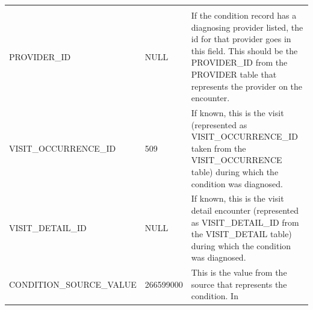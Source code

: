 \documentclass[]{book}
\begin{document}
\begin{longtable}[]{@{}lll@{}}
\begin{minipage}[t]{0.50\columnwidth}
\end{minipage}\tabularnewline
\begin{minipage}[t]{0.27\columnwidth}\raggedright\strut
PROVIDER\_ID\strut
\end{minipage} & \begin{minipage}[t]{0.14\columnwidth}\raggedright\strut
NULL\strut
\end{minipage} & \begin{minipage}[t]{0.50\columnwidth}\raggedright\strut
If the condition record has a diagnosing provider listed, the id for
that provider goes in this field. This should be the PROVIDER\_ID from
the PROVIDER table that represents the provider on the encounter.\strut
\end{minipage}\tabularnewline
\begin{minipage}[t]{0.27\columnwidth}\raggedright\strut
VISIT\_OCCURRENCE\_ID\strut
\end{minipage} & \begin{minipage}[t]{0.14\columnwidth}\raggedright\strut
509\strut
\end{minipage} & \begin{minipage}[t]{0.50\columnwidth}\raggedright\strut
If known, this is the visit (represented as VISIT\_OCCURRENCE\_ID taken
from the VISIT\_OCCURRENCE table) during which the condition was
diagnosed.\strut
\end{minipage}\tabularnewline
\begin{minipage}[t]{0.27\columnwidth}\raggedright\strut
VISIT\_DETAIL\_ID\strut
\end{minipage} & \begin{minipage}[t]{0.14\columnwidth}\raggedright\strut
NULL\strut
\end{minipage} & \begin{minipage}[t]{0.50\columnwidth}\raggedright\strut
If known, this is the visit detail encounter (represented as
VISIT\_DETAIL\_ID from the VISIT\_DETAIL table) during which the
condition was diagnosed.\strut
\end{minipage}\tabularnewline
\begin{minipage}[t]{0.27\columnwidth}\raggedright\strut
CONDITION\_SOURCE\_VALUE\strut
\end{minipage} & \begin{minipage}[t]{0.14\columnwidth}\raggedright\strut
266599000\strut
\end{minipage} & \begin{minipage}[t]{0.50\columnwidth}\raggedright\strut
This is the value from the source that represents the condition. In

\end{minipage}
\end{longtable}
\end{document}
